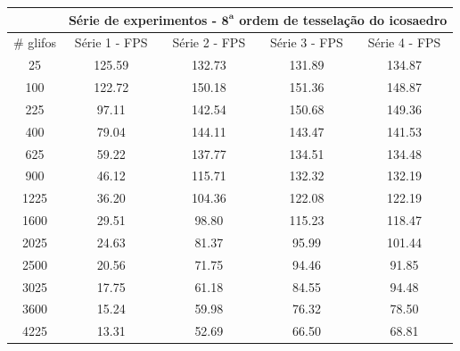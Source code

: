 \documentclass[
    12pt,                %
    oneside,            %
    a4paper,            %
    english,            %
    french,                %
    spanish,            %
    brazil                %
    ]{abntex2}
\begin{document}
\begin{apendicesenv}
\begin{table}[htb]
\begin{tabular}{c|c|c|c|c|}
\cline{2-5}
\textbf{}                       & \multicolumn{4}{c|}{\textbf{Série de experimentos - $\mathbf{8^a}$ ordem de tesselação do icosaedro}} \\ \hline
\multicolumn{1}{|c|}{\# glifos} & Série 1 - FPS       & Série 2 - FPS  & Série 3 - FPS         & Série 4 - FPS       \\ \hline
\multicolumn{1}{|c|}{25}        &  125.59              & 132.73         & 131.89                & 134.87              \\ \hline
\multicolumn{1}{|c|}{100}       &  122.72              & 150.18         & 151.36                & 148.87              \\ \hline
\multicolumn{1}{|c|}{225}       &   97.11              & 142.54         & 150.68                & 149.36              \\ \hline
\multicolumn{1}{|c|}{400}       &   79.04              & 144.11         & 143.47                & 141.53              \\ \hline
\multicolumn{1}{|c|}{625}       &   59.22              & 137.77         & 134.51                & 134.48              \\ \hline
\multicolumn{1}{|c|}{900}       &   46.12              & 115.71         & 132.32                & 132.19              \\ \hline
\multicolumn{1}{|c|}{1225}      &   36.20              & 104.36         & 122.08                & 122.19              \\ \hline
\multicolumn{1}{|c|}{1600}      &   29.51              &  98.80         & 115.23                & 118.47              \\ \hline
\multicolumn{1}{|c|}{2025}      &   24.63              &  81.37         &  95.99                & 101.44              \\ \hline
\multicolumn{1}{|c|}{2500}      &   20.56              &  71.75         &  94.46                &  91.85              \\ \hline
\multicolumn{1}{|c|}{3025}      &   17.75              &  61.18         &  84.55                &  94.48              \\ \hline
\multicolumn{1}{|c|}{3600}      &   15.24              &  59.98         &  76.32                &  78.50              \\ \hline
\multicolumn{1}{|c|}{4225}      &   13.31              &  52.69         &  66.50                &  68.81              \\ \hline

\end{tabular}
\end{table}
\end{apendicesenv}
\end{document}

